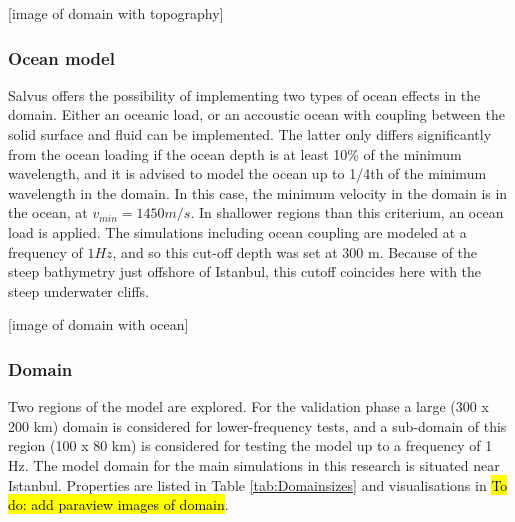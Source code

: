 \documentclass[../Text/00main.tex]{subfiles}
\begin{document}
[image of domain with topography]

\subsubsection{Ocean model}

Salvus offers the possibility of implementing two types of ocean effects in the domain. Either an oceanic load, or an accoustic ocean with coupling between the solid surface and fluid can be implemented. The latter only differs significantly from the ocean loading if the ocean depth is at least 10\% of the minimum wavelength, and it is advised to model the ocean up to 1/4th of the minimum wavelength in the domain. In this case, the minimum velocity in the domain is in the ocean, at $v_{min} = 1450 m/s$. In shallower regions than this criterium, an ocean load is applied. The simulations including ocean coupling are modeled at a frequency of $1 Hz$, and so this cut-off  depth was set at 300 m. Because of the steep bathymetry just offshore of Istanbul, this cutoff coincides here with the steep underwater cliffs. 


[image of domain with ocean]


\subsubsection{Domain}

Two regions of the model are explored. For the validation phase a large (300 x 200 km) domain is considered for lower-frequency tests, and a sub-domain of this region (100 x 80 km) is considered for testing the model up to a frequency of 1 Hz. The model domain for the main simulations in this research is situated near Istanbul. Properties are listed in Table \ref{tab:Domainsizes} and visualisations in \hl{To do: add paraview images of domain}. 
\end{document}
